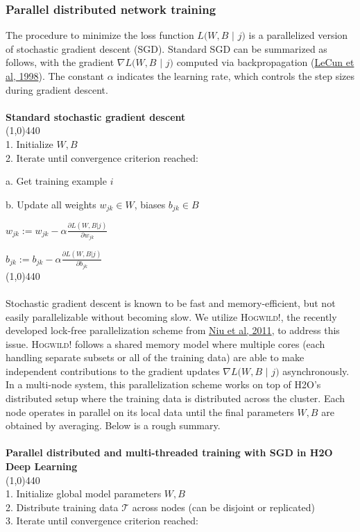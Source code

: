 \subsubsection{Parallel distributed network training} 

The procedure to minimize the loss function $L(W,B$ $|$ $j)$ is a parallelized version of stochastic gradient descent (SGD). Standard SGD can be summarized as follows, with the gradient $\nabla L(W,B$ $|$ $j)$ computed via backpropagation (\href{http://yann.lecun.com/exdb/publis/pdf/lecun-98b.pdf}{LeCun et al, 1998}). The constant $\alpha$ indicates the learning rate, which controls the step sizes during gradient descent.
\\
\\
{\bf{\footnotesize{Standard stochastic gradient descent}}}
\\
\line(1,0){440}
\\
1. Initialize $W,B$ 
\\
2. Iterate until convergence criterion reached:

\hspace{1cm} a. Get training example $i$

\hspace{1cm} b. Update all weights $w_{jk} \in W$, biases $b_{jk} \in B$

\hspace{2cm}  $w_{jk} := w_{jk} - \alpha \frac{\partial L(W,B | j)}{\partial w_{jk}}$

\hspace{2cm} $b_{jk} := b_{jk} - \alpha \frac{\partial L(W,B | j)}{\partial b_{jk}}$
\\
\line(1,0){440}
\\  
\\
Stochastic gradient descent is known to be fast and memory-efficient, but not easily parallelizable without becoming slow. We utilize \textsc{Hogwild!}, the recently developed lock-free parallelization scheme from \href{http://i.stanford.edu/hazy/papers/hogwild-nips.pdf}{Niu et al, 2011}, to address this issue. \textsc{Hogwild!} follows a shared memory model where multiple cores  (each handling separate subsets or all of the training data) are able to make independent contributions to the gradient updates $\nabla L(W,B$ $ |$ $j)$ asynchronously. In a multi-node system, this parallelization scheme works on top of H2O's distributed setup where the training data is distributed across the cluster. Each node operates in parallel on its local data until the final parameters $W,B$ are obtained by averaging. Below is a rough summary.
\\
\\
\noindent
{\bf{\footnotesize{Parallel distributed and multi-threaded training with SGD in H2O Deep Learning}}}
\\
\line(1,0){440}
\\
1. Initialize global model parameters $W,B$
\\
2. Distribute training data $\mathcal{T}$ across nodes (can be disjoint or replicated)
\\
3. Iterate until convergence criterion reached:

